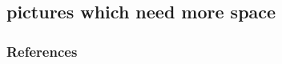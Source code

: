 \documentclass{beamer}
\begin{document}


\subsection{pictures which need more space}
\begin{frame}[plain]
\end{frame}
\begin{frame}[allowframebreaks]
        \frametitle{References}
        {\footnotesize
        
        
        }
\end{frame}
\end{document}
